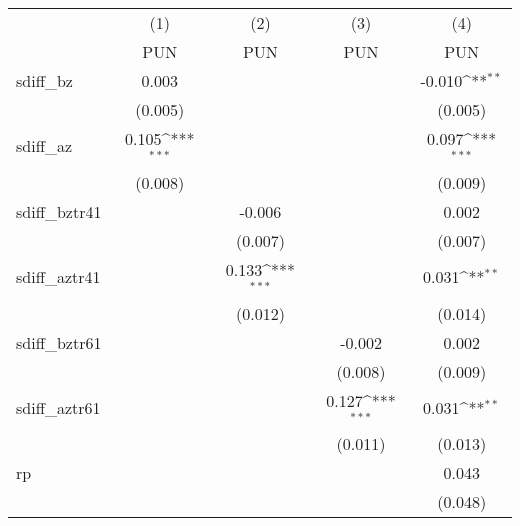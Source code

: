{
\def\sym#1{\ifmmode^{#1}\else\(^{#1}\)\fi}
\begin{tabular}{l*{4}{c}}
\hline\hline
                    &\multicolumn{1}{c}{(1)}&\multicolumn{1}{c}{(2)}&\multicolumn{1}{c}{(3)}&\multicolumn{1}{c}{(4)}\\
                    &\multicolumn{1}{c}{PUN}&\multicolumn{1}{c}{PUN}&\multicolumn{1}{c}{PUN}&\multicolumn{1}{c}{PUN}\\
\hline
sdiff\_bz            &       0.003         &                     &                     &      -0.010\sym{**} \\
                    &     (0.005)         &                     &                     &     (0.005)         \\
[1em]
sdiff\_az            &       0.105\sym{***}&                     &                     &       0.097\sym{***}\\
                    &     (0.008)         &                     &                     &     (0.009)         \\
[1em]
sdiff\_bztr41        &                     &      -0.006         &                     &       0.002         \\
                    &                     &     (0.007)         &                     &     (0.007)         \\
[1em]
sdiff\_aztr41        &                     &       0.133\sym{***}&                     &       0.031\sym{**} \\
                    &                     &     (0.012)         &                     &     (0.014)         \\
[1em]
sdiff\_bztr61        &                     &                     &      -0.002         &       0.002         \\
                    &                     &                     &     (0.008)         &     (0.009)         \\
[1em]
sdiff\_aztr61        &                     &                     &       0.127\sym{***}&       0.031\sym{**} \\
                    &                     &                     &     (0.011)         &     (0.013)         \\
[1em]
rp                  &                     &                     &                     &       0.043         \\
                    &                     &                     &                     &     (0.048)         \\

\end{tabular}}
